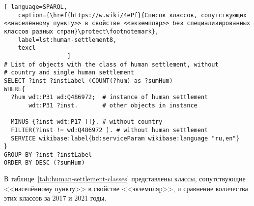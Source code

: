 \lstset{numbers=left, firstnumber=1, frame=single}
\begin{lstlisting}[ language=SPARQL, 
    caption={\href{https://w.wiki/4ePf}{Cписок классов, сопутствующих <<населённому пункту>> в свойстве <<экземпляр>> без специализированных классов разных стран}\protect\footnotemark},
    label=lst:human-settlement8,
    texcl 
                  ]
# List of objects with the class of human settlement, without 
# country and single human settlement
SELECT ?inst ?instLabel (COUNT(?hum) as ?sumHum) 
WHERE{ 
  ?hum wdt:P31 wd:Q486972;  # instance of human settlement
       wdt:P31 ?inst.       # other objects in instance
  
  MINUS {?inst wdt:P17 []}. # without country
  FILTER(?inst != wd:Q486972 ). # without human settlement
  SERVICE wikibase:label{bd:serviceParam wikibase:language "ru,en"}
}  
GROUP BY ?inst ?instLabel
ORDER BY DESC (?sumHum)
\end{lstlisting}%

В таблице~\ref{tab:human-settlement-classes} представлены классы, 
сопутствующие <<населённому пункту>> в свойстве <<экземпляр>>, 
и сравнение количества этих классов за 2017 и 2021 годы.

